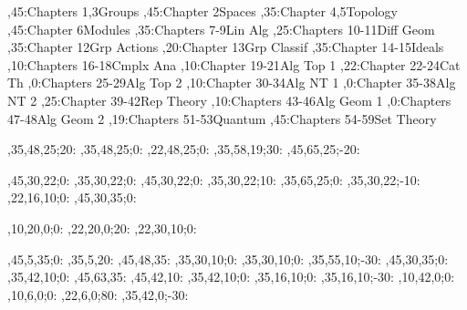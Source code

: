 
\setcounter{diagheight}{50}
\begin{chart}
,45:{Chapters 1,3}{Groups}{}
,45:{Chapter 2}{Spaces}{}
,35:{Chapter 4,5}{Topology}{}
,45:{Chapter 6}{Modules}{}
,35:{Chapters 7-9}{Lin Alg}{}
,25:{Chapters 10-11}{Diff Geom}{}
,35:{Chapter 12}{Grp Actions}{}
,20:{Chapter 13}{Grp Classif}{}
,35:{Chapter 14-15}{Ideals}{}
,10:{Chapters 16-18}{Cmplx Ana}{}
,10:{Chapter 19-21}{Alg Top 1}{}
,22:{Chapter 22-24}{Cat Th}{}
,0:{Chapters 25-29}{Alg Top 2}{}
,10:{Chapter 30-34}{Alg NT 1}{}
,0:{Chapter 35-38}{Alg NT 2}{}
,25:{Chapter 39-42}{Rep Theory}{}
,10:{Chapters 43-46}{Alg Geom 1}{}
,0:{Chapters 47-48}{Alg Geom 2}{}
,19:{Chapters 51-53}{Quantum}{}
,45:{Chapters 54-59}{Set Theory}{}

,35,48,25;20:  %
,35,48,25;0:   %
,22,48,25;0:   %
,35,58,19;30:  %
,45,65,25;-20: %

,45,30,22;0:   %
,35,30,22;0:   %
,45,30,22;0:   %
,35,30,22;10:  %
,35,65,25;0:   %
,35,30,22;-10: %
,22,16,10;0:   %
,45,30,35;0:   %

,10,20,0;0:    %
,22,20,0;20:   %
,22,30,10;0:   %

,45,5,35;0:    %
,35,5,20:      %
,45,48,35:     %
,35,30,10;0:   %
,35,30,10;0:   %
,35,55,10;-30: %
,45,30,35;0:   %
,35,42,10;0:   %
,45,63,35:     %
,45,42,10:     %
,35,42,10;0:   %
,35,16,10;0:   %
,35,16,10;-30: %
,10,42,0;0:    %
,10,6,0;0:     %
,22,6,0;80:     %
,35,42,0;-30:  %
\end{chart}
